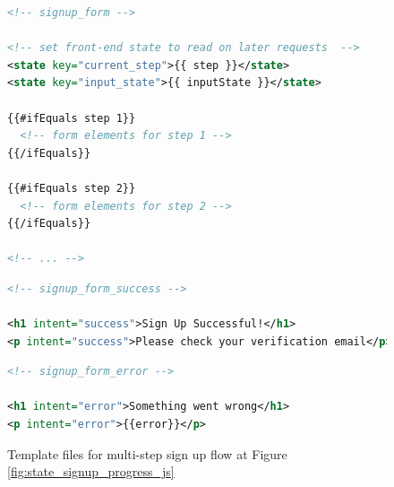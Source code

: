 \begin{figure}
\begin{minipage}{\linewidth}
\begin{lstlisting}[language=xml]
<!-- signup_form -->

<!-- set front-end state to read on later requests  -->
<state key="current_step">{{ step }}</state>
<state key="input_state">{{ inputState }}</state>

{{#ifEquals step 1}}
  <!-- form elements for step 1 -->
{{/ifEquals}}

{{#ifEquals step 2}}
  <!-- form elements for step 2 -->
{{/ifEquals}}

<!-- ... -->
\end{lstlisting}

\begin{lstlisting}[language=xml]
<!-- signup_form_success -->

<h1 intent="success">Sign Up Successful!</h1>
<p intent="success">Please check your verification email</p>
\end{lstlisting}

\begin{lstlisting}[language=xml]
<!-- signup_form_error -->

<h1 intent="error">Something went wrong</h1>
<p intent="error">{{error}}</p>
\end{lstlisting}

\end{minipage}
\caption{Template files for multi-step sign up flow at Figure \ref{fig:state_signup_progress_js}}%
\label{fig:state_signup_progress_xml}%
\end{figure}

